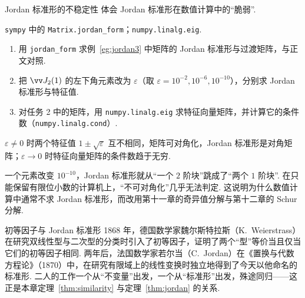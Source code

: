 	\begin{codebox}{Jordan 标准形的不稳定性}
		 体会 Jordan 标准形在数值计算中的“脆弱”.
		
		 \texttt{sympy} 中的 \texttt{Matrix.jordan\_form}；\texttt{numpy.linalg.eig}.
		
		\begin{enumerate}
			\item 用 \texttt{jordan\_form} 求例~\ref{eg:jordan3} 中矩阵的 Jordan 标准形与过渡矩阵，与正文对照.
			\item 把 $\vv J_2(1)$ 的左下角元素改为 $\varepsilon$（取 $\varepsilon=10^{-2},10^{-6},10^{-10}$），分别求 Jordan 标准形与特征值.
			\item 对任务 2 中的矩阵，用 \texttt{numpy.linalg.eig} 求特征向量矩阵，并计算它的条件数（\texttt{numpy.linalg.cond}）.
		\end{enumerate}
		
		 $\varepsilon\ne0$ 时两个特征值 $1\pm\sqrt\varepsilon$ 互不相同，矩阵可对角化，Jordan 标准形是对角矩阵；$\varepsilon\to0$ 时特征向量矩阵的条件数趋于无穷.
		
		 一个元素改变 $10^{-10}$，Jordan 标准形就从“一个 $2$ 阶块”跳成了“两个 $1$ 阶块”. 在只能保留有限位小数的计算机上，“不可对角化”几乎无法判定. 这说明为什么数值计算中通常不求 Jordan 标准形，而改用第十一章的奇异值分解与第十二章的 Schur 分解.
	\end{codebox}
	
	\begin{historybox}{初等因子与 Jordan 标准形}
		1868 年，德国数学家魏尔斯特拉斯（K.~Weierstrass）在研究双线性型与二次型的分类时引入了初等因子，证明了两个“型”等价当且仅当它们的初等因子相同. 两年后，法国数学家若尔当（C.~Jordan）在《置换与代数方程论》（1870）中，在研究有限域上的线性变换时独立地得到了今天以他命名的标准形. 二人的工作一个从“不变量”出发，一个从“标准形”出发，殊途同归——这正是本章定理~\ref{thm:similarity} 与定理~\ref{thm:jordan} 的关系.
	\end{historybox}
	
	\newpage
	\ExLambda
